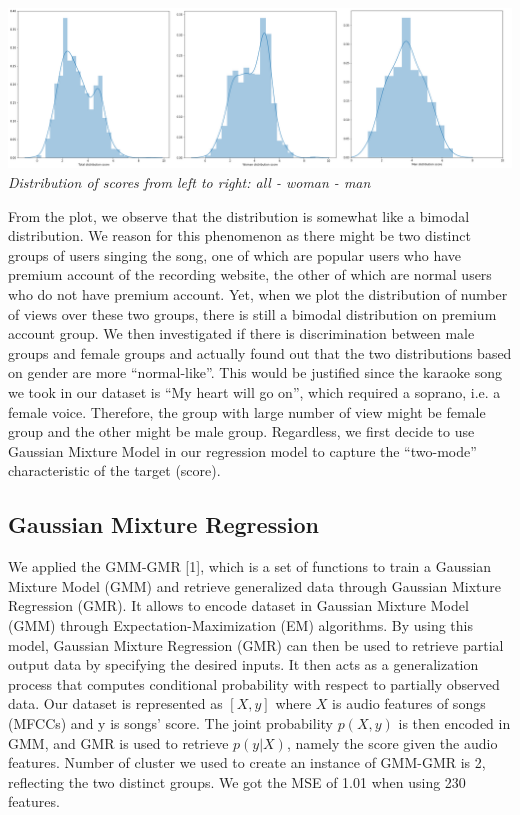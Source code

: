 \documentclass[paper=a4, fontsize=11pt, DIV=13]{scrartcl}
\begin{document}
\begin{center}
\includegraphics[scale=0.25]{img/1.png}\\
\textit{Distribution of scores from left to right: all - woman - man}\\
\end{center}

From the plot, we observe that the distribution is somewhat like a bimodal distribution. We reason for this phenomenon as there might be two distinct groups of users singing the song, one of which are popular users who have premium account of the recording website, the other of which are normal users who do not have premium account. Yet, when we plot the distribution of number of views over these two groups, there is still a bimodal distribution on premium account group. We then investigated if there is discrimination between male groups and female groups and actually found out that the two distributions based on gender are more “normal-like”. This would be justified since the karaoke song we took in our dataset is “My heart will go on”, which required a soprano, i.e. a female voice. Therefore, the group with large number of view might be female group and the other might be male group. Regardless, we first decide to use Gaussian Mixture Model in our regression model to capture the “two-mode” characteristic of the target (score).

\subsection{Gaussian Mixture Regression} 
We applied the GMM-GMR [1], which is a set of functions to train a Gaussian Mixture Model (GMM) and retrieve generalized data through Gaussian Mixture Regression (GMR). It allows to encode dataset in Gaussian Mixture Model (GMM) through Expectation-Maximization (EM) algorithms. By using this model, Gaussian Mixture Regression (GMR) can then be used to retrieve partial output data by specifying the desired inputs. It then acts as a generalization process that computes conditional probability with respect to partially observed data.
Our dataset is represented as $[X,y]$ where $X$ is audio features of songs (MFCCs) and y is songs’ score. The joint probability $p(X,y)$ is then encoded in GMM, and GMR is used to retrieve $p(y|X)$, namely the score given the audio features. Number of cluster we used to create an instance of GMM-GMR is 2, reflecting the two distinct groups. We got the MSE of 1.01 when using 230 features.
\end{document}
